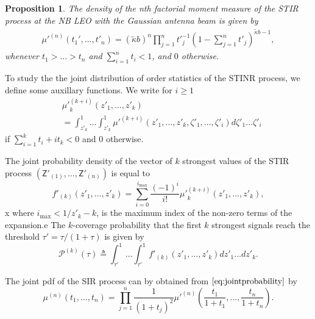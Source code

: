 \documentclass[conference]{IEEEtran}
\theoremstyle{definition}
\theoremstyle{plain}
\newtheorem{prop}[thm4]{Proposition}
\begin{document}
          
          \begin{prop}
            The density of the nth factorial moment measure of the STIR process at the NB LEO with the Gaussian antenna beam is given by
            \begin{align}
              \label{eq:factorialmoment}
              \mu'^{(n)}(t_1',\dots,t'_n) = (\tilde{\kappa}b)^n\prod_{j=1}^n{t'}_{j}^{-1}\left(1- \sum_{j=1}^nt'_j \right)^{\tilde{\kappa}b-1},       
            \end{align}
            whenever $t_1>\dots >t_n$ and $\sum_{i=1}^n t_i <1$, and $0$ otherwise.
          \end{prop}
          To study the the joint distribution of order statistics of the STINR process, we define some auxillary functions. We write for $i\geq 1$
          \begin{align}
            \label{eq:auxillary}
                  &{\mu'}_k^{(k+i)}(z'_1,\dots,z'_k) \nonumber \\
                  &= \int_{z'_k}^1 \dots \int_{z'_k}^1 {\mu'}^{(k+i)}(z'_1,\dots,z'_k,\zeta'_1,\dots,\zeta'_i) d\zeta'_1 \dots \zeta'_i
          \end{align}
           if $\sum_{i=1}^k t_i + it_k <0$ and $0$ otherwise.

          
          The joint probability density of the vector of $k$ strongest values of the STIR process $(\mathsf{Z}'_{(1)}, \dots, \mathsf{Z}'_{(n)})$ is equal to
          \begin{equation}
            \label{eq:jointprobability}
            f'_{(k)}(z'_1,\dots,z'_k)= \sum^{i_{\text{max}}}_{i=0}\frac{(-1)^i}{i!}{\mu'}_k^{(k+i)}(z'_1,\dots,z'_k),
          \end{equation}x
          where $i_{\text{max}}<1/z'_k-k$, is the maximum index of the non-zero terms of the expansion.e
          The $k$-coverage probability that the first $k$ strongest signals reach the threshold $\tau' =\tau/(1+\tau)$ is given by
          \begin{equation}
      \mathcal{P}^{(k)}(\tau) \triangleq  \int_{\tau'}^1\dots \int_{\tau'}^1 f'_{(k)}({z'_1},\dots,{z'_k})dz'_1 \dots d{z'_k}.
          \end{equation}
          
          The joint pdf of the SIR process can by obtained from $\eqref{eq:jointprobability}$ by
          \begin{equation}
            \label{eq:SIRjointprobability}
            \mu^{(n)}(t_1,\dots,t_n) = \prod_{j=1}^n\frac{1}{(1+t_j)^2}\mu'^{(n)}\left(\frac{t_1}{1+t_1},\dots,\frac{t_n}{1+t_n}\right).
          \end{equation}
\end{document}
